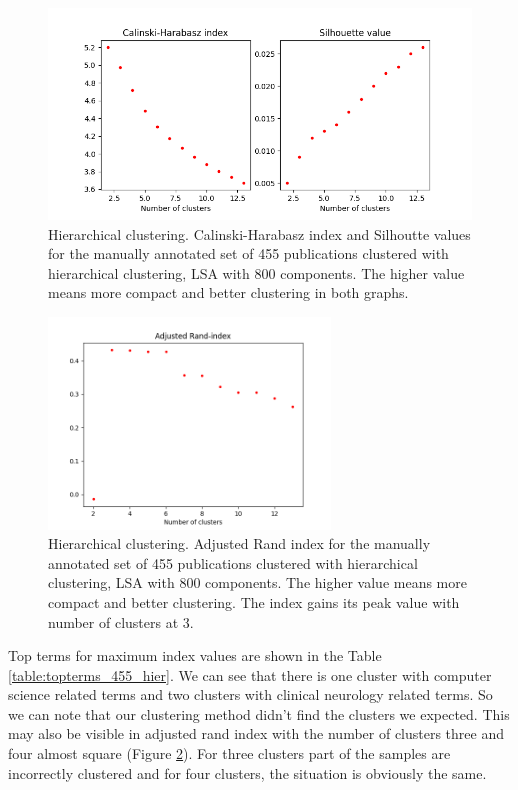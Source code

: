 \begin{figure}[ht]
  \begin{center}    
\includegraphics[width=11.5cm]{images/c-h-silh-index-plot-455-2_12-800-hierarchical.png}
    \caption{Hierarchical clustering. Calinski-Harabasz index and Silhoutte values for the
    manually annotated set of 455 publications clustered with hierarchical
    clustering, LSA with 800 components. The higher value means
    more compact and better clustering in both graphs.}
    \label{fig:ch-silh01}
    \end{center}
\end{figure}

\begin{figure}[htp]
  \begin{center}    
\includegraphics[width=7.5cm]{images/ari-plot-455-2_12-800-hierarchical.png}
    \caption{Hierarchical clustering. Adjusted Rand index for the
    manually annotated set of 455 publications clustered with hierarchical
    clustering, LSA with 800 components. The higher value means
    more compact and better clustering. The index gains its peak value with 
    number of clusters at $3$.}
    \label{fig:ari01}
  \end{center}
\end{figure}

Top terms for maximum index values are shown in the Table 
\ref{table:topterms_455_hier}. We can see that there is one cluster
with computer science related terms and two clusters with clinical
neurology related terms. So we can note that our clustering method
didn't find the clusters we expected. This may also be visible 
in adjusted rand index with the number of clusters three and four almost
square (Figure \ref{fig:ari01}). For three clusters part of the samples are incorrectly 
clustered and for four clusters, the situation is obviously the same.

